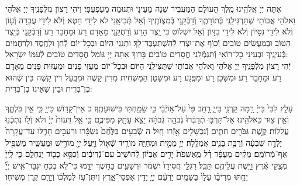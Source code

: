 \documentclass[twoside, openany, parskip=half, 11pt]{book}
\begin{document}
אַתָּה יְיָ אֱלֹהֵֽינוּ מֶֽלֶךְ הָעוֹלָם הַמַּעֲבִיר שֵׁנָה מֵעֵינָי וּתְנוּמָה מֵעַפְעַפָּי׃ וִיהִי רָצוֹן מִלְּֿפָנֶֽיךָ יְיָ אֱלֹהַי וֵאלֹהֵי אֲבוֹתַי שֶׁתַּרְגִּילֵֽנִי בְּֿתוֹרָתֶֽךָ וְֿדַבְּֿקֵֽנִי בְּֿמִצְוֹתֶֽיךָ וְֿאַל תְּֿבִיאֵֽנִי לֹא לִידֵי חֵטְא וְֿלֹא לִידֵי עֲבֵרָה וְֿעָוֹן וְֿלֹא לִידֵי נִסָּיוֹן וְֿלֹא לִידֵי בִזָּיוֹן וְֿאַל יִשְׁלוֹט בִּי יֵֽצֶר הָרַע וְֿרַחֲקֵֽנִי מֵאָדָם רַע וּמֵחָבֵר רַע וְֿדַבְּֿקֵֽנִי בְּֿיֵֽצֶר הַטּוֹב וּבְמַעֲשִׂים טוֹבִים וְֿכוֹף אֶת־יִצְרִי לְֿהִשְׁתַּעְבֶּד־לָךְ׃ וּתְנֵֽנִי הַיּוֹם וּבְכׇל־יוֹם לְֿחֵן וּלְחֶֽסֶד וּלְרַחֲמִים בְּֿעֵינֶֽיךָ וּבְעֵינֵי כׇל־רוֹאַי וְֿתִגְמְֿלֵֽנִי חֲסָדִים טוֹבִים׃ בָּרוּךְ אַתָּה יְיָ גּוֹמֵל חֲסָדִים טוֹבִים לְֿעַמּוֹ יִשְׂרָאֵל:\\
יְֿהִי רָצוֹן מִלְּֿפָנֶֽיךָ יְיָ אֱלֹהַי וֵאלֹהֵי אֲבוֹתַי שֶׁתַּצִּילֵֽנִי הַיּוֹם וּבְכׇל־יוֹם מֵעַזֵּי פָנִים וּמֵעַזּוּת פָּנִים מֵאָדָם רַע וּמֵחָבֵר רַע וּמִשָּׁכֵן רַע וּמִפֶּֽגַע רַע וּמִשָּׂטָן הַמַּשְׁחִית מִדִּין קָשֶׁה וּמִבַּֽעַל דִּין קָשֶׁה בֵּין שְֿׁהוּא בֶן־בְּֿֿרִית וּבֵין שֶׁאֵינוֹ בֶן־בְּֿֿרִית:

 
עָלַ֤ץ לִבִּי֙ בַּייָ֔ רָ֥מָה קַרְנִ֖י בַּייָ֑ רָ֤חַב פִּי֙ עַל־א֣וֹיְֿבַ֔י כִּ֥י שָׂמַ֖חְתִּי בִּישׁוּעָתֶֽךָ׃ ב אֵין־קָד֥וֹשׁ כַּייָ֖ כִּ֣י אֵ֣ין בִּלְתֶּ֑ךָ וְֿאֵ֥ין צ֖וּר כֵּאלֹהֵֽינוּ׃ אַל־תַּרְבּ֤וּ תְֿדַבְּֿרוּ֙ גְּֿבֹהָ֣ה גְֿבֹהָ֔ה יֵצֵ֥א עָתָ֖ק מִפִּיכֶ֑ם כִּ֣י אֵ֤ל דֵּעוֹת֙ יְיָ֔ ולא וְֿל֥וֹ נִתְכְּֿֿנ֖וּ עֲלִלֽוֹת׃ קֶ֥שֶׁת גִּבֹּרִ֖ים חַתִּ֑ים וְֿנִכְשָׁלִ֖ים אָ֥זְֿרוּ חָֽיִל׃ ה שְֿׂבֵעִ֤ים בַּלֶּ֙חֶם֙ נִשְׂכָּ֔רוּ וּרְעֵבִ֖ים חָדֵ֑לּוּ עַד־עֲקָרָה֙ יָלְֿדָ֣ה שִׁבְעָ֔ה וְֿרַבַּ֥ת בָּנִ֖ים אֻמְלָֽלָה׃ יְיָ֖ מֵמִ֣ית וּמְחַיֶּ֑ה מוֹרִ֥יד שְֿׁא֖וֹל וַיָּֽעַל׃ יְיָ֖ מוֹרִ֣ישׁ וּמַעֲשִׁ֑יר מַשְׁפִּ֖יל אַף־מְֿרוֹמֵֽם׃ מֵקִ֨ים מֵעָפָ֜ר דָּ֗ל מֵֽאַשְׁפֹּת֙ יָרִ֣ים אֶבְי֔וֹן לְֿהוֹשִׁיב֙ עִם־נְֿדִיבִ֔ים וְֿכִסֵּ֥א כָב֖וֹד יַנְחִלֵ֑ם כִּ֤י לַֽייָ֙ מְֿצֻ֣קֵי אֶ֔רֶץ וַיָּ֥שֶׁת עֲלֵיהֶ֖ם תֵּבֵֽל׃ רַגְלֵ֤י חֲסִידָו֙ יִשְׁמֹ֔ר וּרְשָׁעִ֖ים בַּחֹ֣שֶׁךְ יִדָּ֑מּוּ כִּי־לֹ֥א בְֿכֹ֖חַ יִגְבַּר־אִֽישׁ׃ יְיָ֞ יֵחַ֣תּוּ מְֿרִיבָ֗ו עָלָו֙ בַּשָּׁמַ֣יִם יַרְעֵ֔ם יְיָ֖ יָדִ֣ין אַפְסֵי־אָ֑רֶץ וְֿיִתֶּן־עֹ֣ז לְֿמַלְכּ֔וֹ וְֿיָרֵ֖ם קֶ֥רֶן מְֿשִׁיחֽוֹ׃\\
\end{document}
